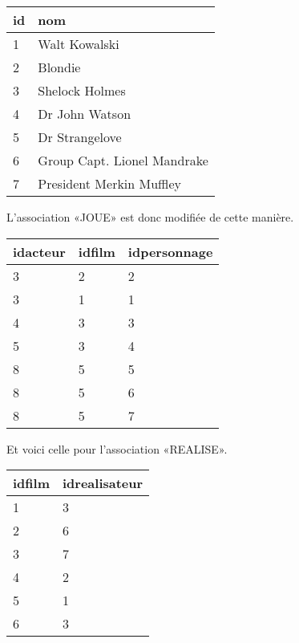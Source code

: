 \begin{center}
\begin{tabular}{ll}
\toprule
id & nom\\
\midrule
1 & Walt Kowalski\\
2 & Blondie\\
3 & Shelock Holmes\\
4 & Dr John Watson\\
5 & Dr Strangelove\\
6 & Group Capt. Lionel Mandrake\\
7 & President Merkin Muffley\\
\bottomrule
\end{tabular}
\end{center}

L'association «JOUE» est donc modifiée de cette manière.
\begin{center}
  \begin{tabular}{lll}
    \toprule
    idacteur & idfilm & idpersonnage\\
    \midrule
    3 & 2 & 2\\
    3 & 1 & 1\\
    4 & 3 & 3\\
    5 & 3 & 4\\
    8 & 5 & 5\\
    8 & 5 & 6\\
    8 & 5 & 7\\
\bottomrule
  \end{tabular}
\end{center}
Et voici celle pour l'association «REALISE».
\begin{center}
\begin{tabular}{ll}
\toprule
  idfilm & idrealisateur\\
\midrule
  1 & 3\\
  2 & 6\\
  3 & 7\\
  4 & 2\\
  5 & 1\\
  6 & 3\\
\bottomrule
\end{tabular}
\end{center}

